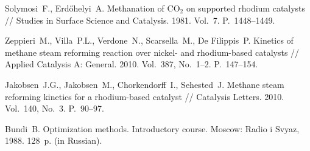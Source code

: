\documentclass{cmi}
\begin{document}
\begin{biblio_lat}
Solymosi~F., Erdőhelyi~A. Methanation of CO$_2$ on supported rhodium catalysts // Studies in Surface Science and Catalysis. 1981. Vol.~7. P.~1448--1449.

Zeppieri~M., Villa~P.L., Verdone~N., Scarsella~M., De Filippis~P. Kinetics of methane steam reforming reaction over nickel- and rhodium-based catalysts // Applied Catalysis A: General. 2010. Vol.~387, No.~1--2. P.~147--154.

Jakobsen~J.G., Jakobsen~M., Chorkendorff~I., Sehested~J. Methane steam reforming kinetics for a rhodium-based catalyst // Catalysis Letters. 2010. Vol.~140, No.~3. P.~90--97.

Bundi~B. Optimization methods. Introductory course. Moscow: Radio i Svyaz, 1988. 128~p. (in Russian).



\end{biblio_lat}
\end{document}

